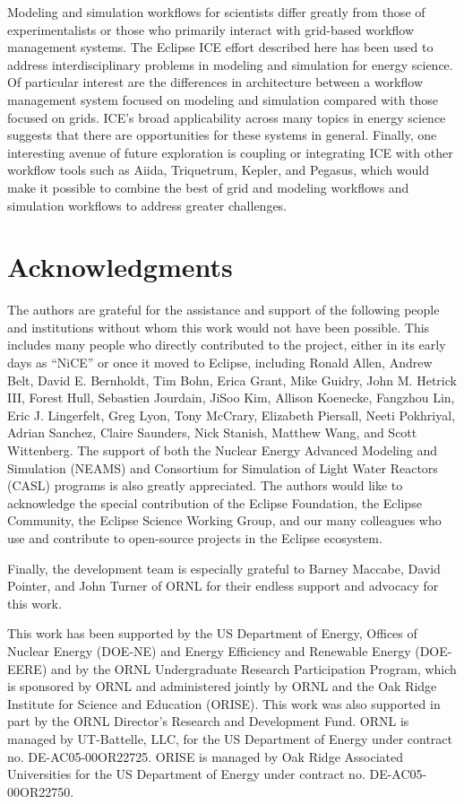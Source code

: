 Modeling and simulation workflows for scientists differ
greatly from those of experimentalists or those who primarily interact with
grid-based workflow management systems. The Eclipse ICE effort described here 
has been used to address interdisciplinary problems in 
modeling and simulation for energy science. Of particular interest are the
differences in architecture between a workflow management system focused
on modeling and simulation compared with those focused on grids. ICE's broad
applicability across many topics in energy science suggests that
there are opportunities for these systems in general. Finally, one 
interesting avenue of future exploration is coupling or integrating ICE 
with other workflow tools such as Aiida, Triquetrum, Kepler, and Pegasus,
which would make it possible to combine the best of grid and modeling workflows and
simulation workflows to address greater challenges.

\section*{Acknowledgments}\label{acknowledgments}

The authors are grateful for the assistance and support of the following
people and institutions without whom this work would not have been
possible. This includes many people who directly contributed to the
project, either in its early days as ``NiCE'' or once it moved to
Eclipse, including Ronald Allen, Andrew Belt, David E.
Bernholdt, Tim Bohn, Erica Grant, Mike Guidry, John M. Hetrick III, Forest Hull, 
Sebastien Jourdain, JiSoo Kim, Allison Koenecke, Fangzhou Lin, Eric J. Lingerfelt, Greg
Lyon, Tony McCrary, Elizabeth Piersall, Neeti
Pokhriyal, Adrian Sanchez, Claire Saunders, Nick Stanish, Matthew Wang, and
Scott Wittenberg. The support of both the Nuclear Energy Advanced Modeling and Simulation (NEAMS) and Consortium for Simulation of Light Water Reactors (CASL) programs is also
greatly appreciated. The authors would like to acknowledge the special
contribution of the Eclipse Foundation, the Eclipse Community, the
Eclipse Science Working Group, and our many colleagues who use and
contribute to open-source projects in the Eclipse ecosystem.

Finally, the development team is especially grateful to Barney Maccabe,
David Pointer, and John Turner of ORNL for their
endless support and advocacy for this work.

This work has been supported by the US Department of Energy, Offices of
Nuclear Energy (DOE-NE) and Energy Efficiency and Renewable Energy
(DOE-EERE) and by the ORNL Undergraduate Research Participation
Program, which is sponsored by ORNL and administered jointly by ORNL and
the Oak Ridge Institute for Science and Education (ORISE). This work was
also supported in part by the ORNL Director's
Research and Development Fund. ORNL is managed by UT-Battelle, LLC, for
the US Department of Energy under contract no. DE-AC05-00OR22725. ORISE
is managed by Oak Ridge Associated Universities for the US Department of
Energy under contract no. DE-AC05-00OR22750.

